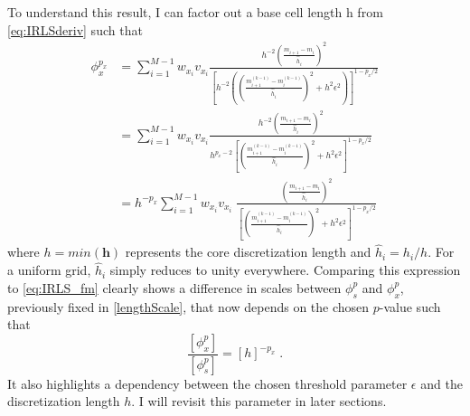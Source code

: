 To understand this result, I can factor out a base cell length h from \eqref{eq:IRLSderiv} such that
\begin{equation} \label{eq:IRLSderivFactored}
\begin{split}
\phi_x^{p_x} &= \sum_{i=1}^{M-1} w_{x_i} v_{x_i} \frac{h^{-2} \left(\frac{m_{i+1} - m_i}{\hat h_i}\right)^2}{{{\left[h^{-2}\left(\left(\frac{m^{(k-1)}_{i+1} - m^{(k-1)}_i}{\hat h_i}\right)^{2} +h^2\epsilon^2 \right) \right]}^{1-p_x/2}} } \\
&=\sum_{i=1}^{M-1} w_{x_i} v_{x_i} \frac{h^{-2} \left(\frac{m_{i+1} - m_i}{\hat h_i}\right)^2}{{{h^{p_x-2}\left[\left(\frac{m^{(k-1)}_{i+1} - m^{(k-1)}_i}{\hat h_i}\right)^{2} +h^2\epsilon^2 \right]}^{1-p_x/2}} } \\ 
&=h^{-p_x} \sum_{i=1}^{M-1} w_{x_i} v_{x_i} \; \frac{ \left(\frac{m_{i+1} - m_i}{\hat h_i}\right)^2}{{{\left[\left(\frac{m^{(k-1)}_{i+1} - m^{(k-1)}_i}{\hat h_i}\right)^{2} +h^2\epsilon^2 \right]}^{1-p_x/2}} }
\end{split}
\end{equation}
where $h=min(\mathbf{h})$ represents the core discretization length and $\hat h_i = h_i / h$. For a uniform grid, $\hat h_i$ simply reduces to unity everywhere.
Comparing this expression to \eqref{eq:IRLS_fm} clearly shows a difference in scales between $\phi_s^p$ and $\phi_x^p$, previously fixed in \eqref{lengthScale}, that now depends on the chosen $p$-value such that
\begin{equation}\label{lengthScaleLp}
\frac{[\phi_x^p] }{ [\phi_s^p]} = {[h]}^{-p_x}\;.
\end{equation} 
It also highlights a dependency between the chosen threshold parameter $\epsilon$ and the discretization length $h$. I will revisit this parameter in later sections.

